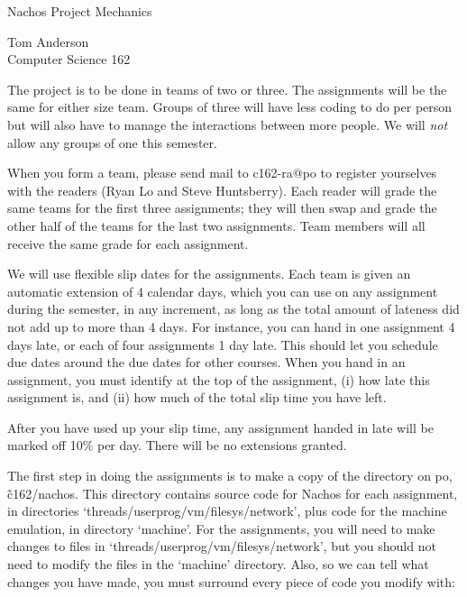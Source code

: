 


\begin{center}
{\large Nachos Project Mechanics
\vspace{.2in}

Tom Anderson\\
Computer Science 162
}
\end{center}

The project is to be done in teams of two or three.  The assignments
will be the same for either size team.  Groups of three will have 
less coding to do per person but will also have to manage the 
interactions between more people.
We will {\em not} allow any groups of one this semester. 

When you form a team, please send mail to c162-ra@po to register
yourselves with the readers (Ryan Lo and Steve Huntsberry).  Each reader 
will grade the same teams for the first three assignments; they will 
then swap and grade the other half of the teams for the last two assignments.  
Team members will all receive the same grade for each assignment.

We will use flexible slip dates for the assignments.
Each team is given an automatic extension of 4 calendar days,
which you can use on any assignment during the semester, in any
increment, as long as the total amount of lateness did not add up
to more than 4 days.  For instance, you can hand in one assignment
4 days late, or each of four assignments 1 day late.
This should let you schedule due dates around the due dates for 
other courses.  When you hand in an assignment, you must
identify at the top of the assignment, (i) how late this assignment is, 
and (ii) how much of the total slip time you have left.

After you have used up your slip time, any assignment handed in late
will be marked off 10\% per day.  There will be no extensions granted.

The first step in doing the assignments is to make a copy
of the directory on po, \~c162/nachos.
This directory contains source code for Nachos for each assignment,
in directories `threads/userprog/vm/filesys/network', plus code for 
the machine emulation, in 
directory `machine'.  For the assignments, you will need to make changes 
to files in `threads/userprog/vm/filesys/network', but you should not need 
to modify the files in 
the `machine' directory.  Also, so we can tell what changes you have 
made, you must surround every piece of code you modify with:

